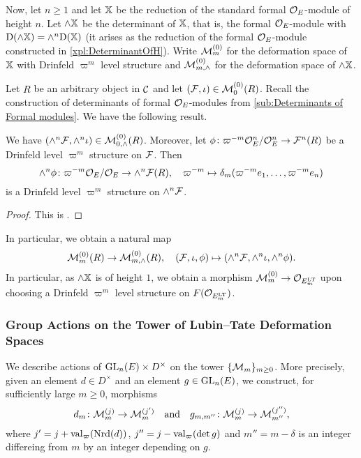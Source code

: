 \documentclass[../main.tex]{subfiles}
\begin{document}
Now, let $n \geq 1$ and let $\mathbb{X}$ be the reduction of the standard formal 
$\mathcal{O}_E$-module of height $n$. Let $\wedge \mathbb{X}$ be the determinant of $\mathbb{X}$,
that is, the formal $\mathcal{O}_E$-module with $\mathrm{D}(\wedge \mathbb{X}) = \wedge^n \mathrm{D}(\mathbb{X})$
(it arises as the reduction of the formal $\mathcal{O}_E$-module constructed in
\cref{xpl:DeterminantOfH}).
Write $\mathcal{M}_m^{(0)}$ for the deformation space of $\mathbb{X}$ with Drinfeld $\varpi^m$
level structure and $\mathcal{M}_{m, \wedge}^{(0)}$ for the deformation space of $\wedge \mathbb{X}$. 

Let $R$ be an arbitrary object in $\mathcal{C}$ and let $(\mathcal{F}, \iota) \in \mathcal{M}_0^{(0)}(R)$. 
Recall the construction of determinants of formal $\mathcal{O}_E$-modules
from \cref{sub:Determinants of Formal modules}. We have the following result.

\begin{lem}\label{lem:DeterminantOfDrinfeldStructure}
  We have $(\wedge^n \mathcal{F}, \wedge^n \iota) \in \mathcal{M}_{0, \wedge}^{(0)}(R)$.
  Moreover,
  let $\phi\colon \varpi^{-m} \mathcal{O}_E^n/\mathcal{O}_E^n \to  \mathcal{F}^n(R)$ be a Drinfeld level
  $\varpi^m$ structure on $\mathcal{F}$. Then 
  \begin{equation*}
    \wedge^n \phi \colon \varpi^{-m} \mathcal{O}_E/\mathcal{O}_E \to \wedge^n\mathcal{F}(R), \quad 
  \varpi^{-m} \mapsto \delta_m(\varpi^{-m} e_1, \dots, \varpi^{-m} e_n)
  \end{equation*}
  is a Drinfeld level $\varpi^m$ structure on $\wedge^n \mathcal{F}$.
\begin{proof}
  This is \cite[Proposition 2.11]{weinstein2016semistable}.
\end{proof}
\end{lem}

In particular, we obtain a natural map
\begin{equation*}
  \mathcal{M}_m^{(0)}(R) \to \mathcal{M}^{(0)}_{m, \wedge}(R), \quad (\mathcal{F}, \iota, \phi)
  \mapsto (\wedge^n \mathcal{F}, \wedge^n \iota, \wedge^n \phi).
\end{equation*}
In particular, as $\wedge \mathbb{X}$ is of height $1$, we obtain a morphism $\mathcal{M}_m^{(0)}
\to \mathcal{O}_{E^{\mathrm{LT}}_m}$ upon choosing a Drinfeld $\varpi^m$ level
structure on $F(\mathcal{O}_{E^{\mathrm{LT}}_m})$. 

\subsubsection{Group Actions on the Tower of Lubin--Tate Deformation Spaces} %
\label{ssub:Group Actions on the Tower of Lubin--Tate Deformation Spaces}
We describe actions of $\operatorname{GL}_n(E) \times D^\times$ on the tower
$\{\mathcal{M}_m\}_{m \geq 0}$. More precisely, given an element $d \in D^\times$ and an element
$g \in \operatorname{GL}_n(E)$, we construct, for sufficiently large $m\geq 0$, morphisms
\begin{equation*}
  d_m \colon \mathcal{M}_m^{(j)} \to \mathcal{M}_m^{(j')} \quad \text{and} \quad
  g_{m,m''} \colon \mathcal{M}_m^{(j)} \to \mathcal{M}_{m''}^{(j'')},
\end{equation*}
where $j'= j+\mathrm{val}_\varpi(\operatorname{Nrd}(d))$, $j'' = j - \mathrm{val}_\varpi(\det g)$ and $m''
= m-\delta$ is an integer differeing from $m$ by an integer depending on $g$. 
\end{document}
